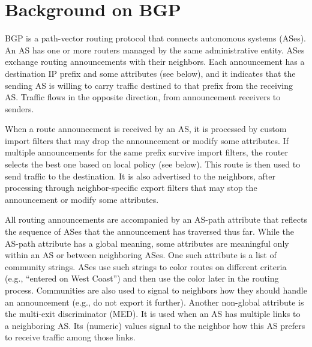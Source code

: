 \documentclass[10pt]{sigalternate052015} %
\newcommand{\todo}[1]{\textcolor{red}{[TODO: #1]}}
\newcommand{\sysname}{{\small \sf Propane}\xspace}
\begin{document}





%
%
%
%

\section{Background on BGP}
\label{sec:background}


BGP is a path-vector routing protocol that connects autonomous systems (ASes). An AS has one or more routers managed by the same administrative entity. ASes exchange routing announcements with their neighbors. Each announcement has a destination IP prefix and some attributes (see below), and it indicates that the sending AS is willing to carry traffic destined to that prefix from the receiving AS. Traffic flows in the opposite direction, from announcement receivers to senders.

When a route announcement is received by an AS, it is processed by custom import filters that may drop the announcement or modify some attributes. If multiple announcements for the same prefix survive import filters, the router selects the best one based on local policy (see below). This route is then used to send traffic to the destination. It is also advertised to the neighbors, after processing through neighbor-specific export filters that may stop the announcement or modify some attributes.

All routing announcements are accompanied by an AS-path attribute that reflects the sequence of ASes that the announcement has traversed thus far. While the AS-path attribute has a global meaning, some attributes are meaningful only within an AS or between neighboring ASes.  One such attribute is a list of community strings. ASes use such strings to color routes on different criteria (e.g., ``entered on West Coast'') and then use the color later in the routing process.  Communities are also used to signal to neighbors how they should handle an announcement (e.g., do not export it further). Another non-global attribute is the multi-exit discriminator (MED). It is used when an AS has multiple links to a neighboring AS.  Its (numeric) values signal to the neighbor how this AS prefers to receive traffic among those links.
\end{document}
